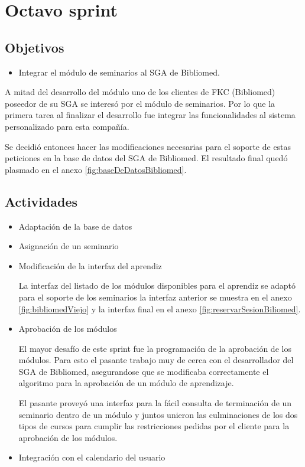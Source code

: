\section{Octavo sprint} %
\label{sec:octavo_sprint}

\subsection{Objetivos}

\begin{itemize}
	\item Integrar el módulo de seminarios al SGA de Bibliomed.
\end{itemize}

A mitad del desarrollo del módulo uno de los clientes de FKC (Bibliomed) poseedor de su SGA se interesó por el módulo de seminarios. Por lo que la primera tarea al finalizar el desarrollo fue integrar las funcionalidades al sistema personalizado para esta compañía.

Se decidió entonces hacer las modificaciones necesarias para el soporte de estas peticiones en la base de datos del SGA de Bibliomed. El resultado final quedó plasmado en el anexo \ref{fig:baseDeDatosBibliomed}.

\subsection{Actividades} %
\label{sub:actividades8}

\begin{itemize}

\item Adaptación de la base de datos

\item Asignación de un seminario

\item Modificación de la interfaz del aprendiz

La interfaz del listado de los módulos disponibles para el aprendiz se adaptó para el soporte de los seminarios la interfaz anterior se muestra en el anexo \ref{fig:bibliomedViejo} y la interfaz final en el anexo \ref{fig:reservarSesionBiliomed}.

\item Aprobación de los módulos

El mayor desafío de este sprint fue la programación de la aprobación de los módulos. Para esto el pasante trabajo muy de cerca con el desarrollador del SGA de Bibliomed, asegurandose que se modificaba correctamente el algoritmo para la aprobación de un módulo de aprendizaje.

El pasante proveyó una interfaz para la fácil consulta de terminación de un seminario dentro de un módulo y juntos unieron las culminaciones de los dos tipos de cursos para cumplir las restricciones pedidas por el cliente para la aprobación de los módulos.

\item Integración con el calendario del usuario

\end{itemize}


